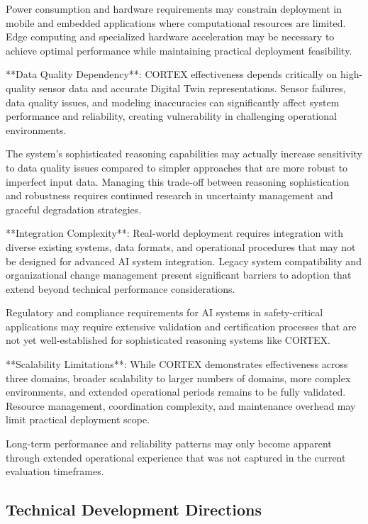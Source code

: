 Power consumption and hardware requirements may constrain deployment in mobile and embedded applications where computational resources are limited. Edge computing and specialized hardware acceleration may be necessary to achieve optimal performance while maintaining practical deployment feasibility.

**Data Quality Dependency**:
CORTEX effectiveness depends critically on high-quality sensor data and accurate Digital Twin representations. Sensor failures, data quality issues, and modeling inaccuracies can significantly affect system performance and reliability, creating vulnerability in challenging operational environments.

The system's sophisticated reasoning capabilities may actually increase sensitivity to data quality issues compared to simpler approaches that are more robust to imperfect input data. Managing this trade-off between reasoning sophistication and robustness requires continued research in uncertainty management and graceful degradation strategies.

**Integration Complexity**:
Real-world deployment requires integration with diverse existing systems, data formats, and operational procedures that may not be designed for advanced AI system integration. Legacy system compatibility and organizational change management present significant barriers to adoption that extend beyond technical performance considerations.

Regulatory and compliance requirements for AI systems in safety-critical applications may require extensive validation and certification processes that are not yet well-established for sophisticated reasoning systems like CORTEX.

**Scalability Limitations**:
While CORTEX demonstrates effectiveness across three domains, broader scalability to larger numbers of domains, more complex environments, and extended operational periods remains to be fully validated. Resource management, coordination complexity, and maintenance overhead may limit practical deployment scope.

Long-term performance and reliability patterns may only become apparent through extended operational experience that was not captured in the current evaluation timeframes.

\subsection{Technical Development Directions}

